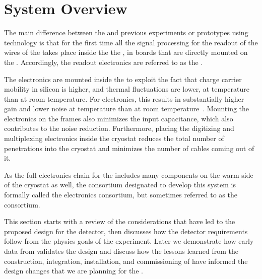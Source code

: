 \section{System Overview}
\label{sec:fdsp-tpcelec-overview}

The main difference between the    %
and 
previous experiments or prototypes using  technology is
that for the first time all the signal processing for the readout of the
wires of the  takes place inside the the , in boards that 
are directly mounted on the . Accordingly, the  
readout electronics are referred to as the . 

The electronics are 
mounted inside the  to exploit the fact that charge carrier 
mobility in silicon is higher, and %
thermal fluctuations are lower,  
at  temperature than at room temperature. For  
electronics, this results in substantially higher gain and lower noise 
at  temperature than at room temperature~\cite{DeGeronimo:2011zz}.
Mounting the  electronics on the  frames also minimizes 
the input capacitance, which also contributes to the noise reduction.  
Furthermore, placing the digitizing and multiplexing electronics inside 
the cryostat reduces the total number of penetrations into the cryostat 
and minimizes the number of cables coming out of it. %

As the full  electronics chain for the  includes 
many components on the warm side of the cryostat as well, the  
consortium designated to develop %
this system is formally called 
the    electronics consortium, but  %
sometimes referred to as the  consortium. %

This section starts with a review of the considerations that
have led to the proposed design for the   detector, 
then discusses how the detector requirements follow %
from the physics goals of the experiment. %
Later we demonstrate how early data from  
validates the design and  %
discuss how the lessons learned from the construction,
integration, installation, and commissioning of  have 
informed the design changes that we are planning for the 
. %

